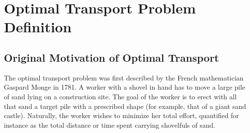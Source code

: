 \chapter{Optimal Transport Problem Definition}
\section{Original Motivation of Optimal Transport}
The optimal transport problem was first described by the French mathematician Gaspard Monge in 1781. A worker with a shovel in hand has to move a large pile of sand lying on a construction site. The goal of the worker is to erect with all that sand a target pile with a prescribed shape (for example, that of a giant sand castle). Naturally, the worker wishes to minimize her total effort, quantified for instance as the total distance or time spent carrying shovelfuls of sand.\cite{COTFNT}

